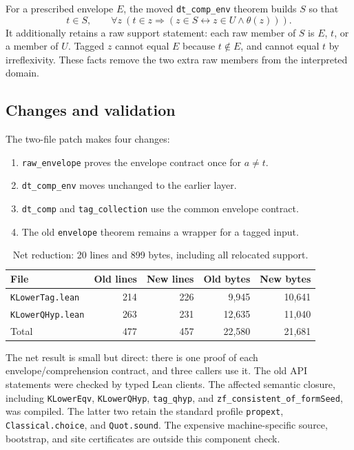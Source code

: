 \documentclass[11pt,letterpaper]{article}
\theoremstyle{definition}\newtheorem{definition}[theorem]{Definition}
\theoremstyle{remark}\newtheorem{remark}[theorem]{Remark}
\newcommand{\code}[1]{\texttt{\small #1}}
\begin{document}
For a prescribed envelope $E$, the moved \code{dt\_comp\_env} theorem builds $S$ so that
\[
 t\in S,\qquad
 \forall z\ (t\in z\Rightarrow
 (z\in S\leftrightarrow z\in U\land\theta(z))).
\]
It additionally retains a raw support statement: each raw member of $S$ is $E$, $t$, or a member of $U$. Tagged $z$ cannot equal $E$ because $t\notin E$, and cannot equal $t$ by irreflexivity. These facts remove the two extra raw members from the interpreted domain.

\subsection{Changes and validation}

The two-file patch makes four changes:
\begin{enumerate}
\item \code{raw\_envelope} proves the envelope contract once for $a\ne t$.
\item \code{dt\_comp\_env} moves unchanged to the earlier layer.
\item \code{dt\_comp} and \code{tag\_collection} use the common envelope contract.
\item The old \code{envelope} theorem remains a wrapper for a tagged input.
\end{enumerate}

\begin{table}[ht]
\centering
\begin{tabular}{@{}lrrrr@{}}
\toprule
File & Old lines & New lines & Old bytes & New bytes\\
\midrule
\code{KLowerTag.lean} & 214 & 226 & 9,945 & 10,641\\
\code{KLowerQHyp.lean} & 263 & 231 & 12,635 & 11,040\\
\midrule
Total & 477 & 457 & 22,580 & 21,681\\
\bottomrule
\end{tabular}
\caption{Net reduction: 20 lines and 899 bytes, including all relocated support.}
\end{table}

The net result is small but direct: there is one proof of each envelope/comprehension contract, and three callers use it. The old API statements were checked by typed Lean clients. The affected semantic closure, including \code{KLowerEqv}, \code{KLowerQHyp}, \code{tag\_qhyp}, and \code{zf\_consistent\_of\_formSeed}, was compiled. The latter two retain the standard profile \code{propext}, \code{Classical.choice}, and \code{Quot.sound}. The expensive machine-specific source, bootstrap, and site certificates are outside this component check.
\end{document}
